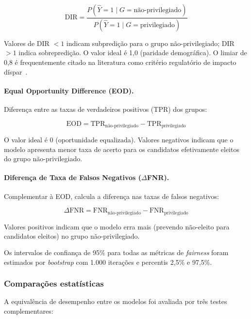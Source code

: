 \documentclass[12pt]{article}
\begin{document}
\begin{equation}
\text{DIR} = \frac{P(\hat{Y}=1 \mid G=\text{não-privilegiado})}{P(\hat{Y}=1 \mid G=\text{privilegiado})}
\end{equation}

Valores de DIR $< 1$ indicam subpredição para o grupo não-privilegiado; DIR $> 1$ indica sobrepredição. O valor ideal é 1,0 (paridade demográfica). O limiar de 0,8 é frequentemente citado na literatura como critério regulatório de impacto díspar~\cite{feldman:2015}.

\paragraph{Equal Opportunity Difference (EOD).} Diferença entre as taxas de verdadeiros positivos (TPR) dos grupos:

\begin{equation}
\text{EOD} = \text{TPR}_{\text{não-privilegiado}} - \text{TPR}_{\text{privilegiado}}
\end{equation}

O valor ideal é 0 (oportunidade equalizada). Valores negativos indicam que o modelo apresenta menor taxa de acerto para os candidatos efetivamente eleitos do grupo não-privilegiado.

\paragraph{Diferença de Taxa de Falsos Negativos ($\Delta$FNR).} Complementar à EOD, calcula a diferença nas taxas de falsos negativos:

\begin{equation}
\Delta\text{FNR} = \text{FNR}_{\text{não-privilegiado}} - \text{FNR}_{\text{privilegiado}}
\end{equation}

Valores positivos indicam que o modelo erra mais (prevendo não-eleito para candidatos eleitos) no grupo não-privilegiado.

Os intervalos de confiança de 95\% para todas as métricas de \textit{fairness} foram estimados por \textit{bootstrap} com 1.000 iterações e percentis 2,5\% e 97,5\%.

\subsubsection{Comparações estatísticas}

A equivalência de desempenho entre os modelos foi avaliada por três testes complementares:
\end{document}
